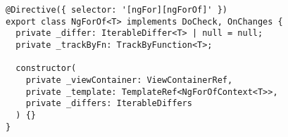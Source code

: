 \begin{verbatim}
@Directive({ selector: '[ngFor][ngForOf]' })
export class NgForOf<T> implements DoCheck, OnChanges {
  private _differ: IterableDiffer<T> | null = null;
  private _trackByFn: TrackByFunction<T>;

  constructor(
    private _viewContainer: ViewContainerRef,
    private _template: TemplateRef<NgForOfContext<T>>,
    private _differs: IterableDiffers
  ) {}
}
\end{verbatim}

